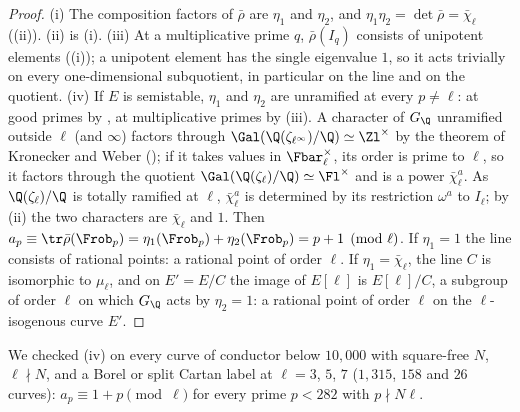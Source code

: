 \begin{proof}
(i) The composition factors of $\bar\rho$ are $\eta_1$ and $\eta_2$, and $\eta_1\eta_2=\det\bar\rho=\bar\chi_\ell$ ((ii)). (ii) is
(i). (iii) At a multiplicative prime $q$, $\bar\rho(I_q)$ consists of unipotent elements ((i)); a unipotent element
has the single eigenvalue $1$, so it acts trivially on every one-dimensional subquotient, in particular on the line and on the quotient. (iv) If $E$
is semistable, $\eta_1$ and $\eta_2$ are unramified at every $p\ne\ell$: at good primes by , at multiplicative primes by (iii). A character
of $G_\Q$ unramified outside $\ell$ (and $\infty$) factors through $\Gal(\Q(\zeta_{\ell^\infty})/\Q)\simeq\Zl^\times$ by the theorem of Kronecker and Weber (); if it
takes values in $\Fbar_\ell^\times$, its order is prime to $\ell$, so it factors through the quotient $\Gal(\Q(\zeta_\ell)/\Q)\simeq\Fl^\times$ and is a power $\bar\chi_\ell^a$. As
$\Q(\zeta_\ell)/\Q$ is totally ramified at $\ell$, $\bar\chi_\ell^a$ is determined by its restriction $\omega^a$ to $I_\ell$; by (ii) the two characters are $\bar\chi_\ell$ and $1$.
Then $a_p\equiv\tr\bar\rho(\Frob_p)=\eta_1(\Frob_p)+\eta_2(\Frob_p)=p+1\pmod\ell$. If $\eta_1=1$ the line consists of rational points: a rational point of order $\ell$. If
$\eta_1=\bar\chi_\ell$, the line $C$ is isomorphic to $\mu_\ell$, and on $E'=E/C$ the image of $E[\ell]$ is $E[\ell]/C$, a subgroup of order $\ell$
on which $G_\Q$ acts by $\eta_2=1$: a rational point of order $\ell$ on the $\ell$-isogenous curve $E'$.
\end{proof}

We checked (iv) on every curve of conductor below $10{,}000$ with square-free $N$, $\ell\nmid N$, and a Borel or split Cartan label at $\ell=3$, $5$, $7$ ($1{,}315$,
$158$ and $26$ curves): $a_p\equiv1+p\pmod\ell$ for every prime $p<282$ with $p\nmid N\ell$.

